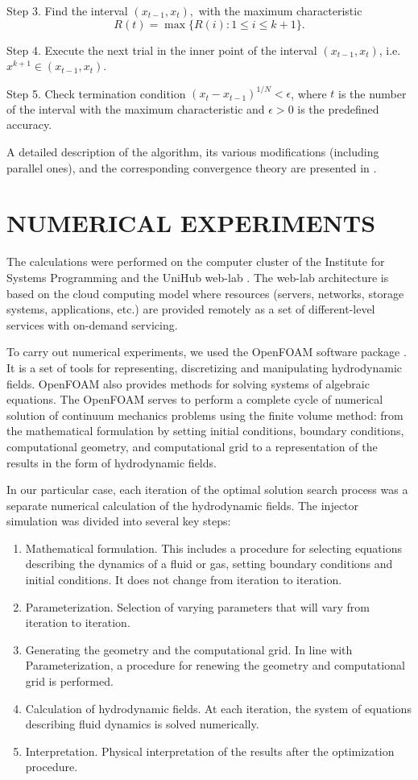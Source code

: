 \documentclass{aip-cp}
\begin{document}
Step 3. Find the interval $(x_{t-1},x_t),$ with the maximum characteristic 
\[
R(t)=\max\{R(i):1 \leq i \leq k+1\}.
\]

Step 4. Execute the next trial in the inner point of the interval  $(x_{t-1},x_t)$, i.e. $x^{k+1} \in (x_{t-1},x_t)$.

Step 5. Check termination condition  $\left(x_t-x_{t-1}\right)^{1/N}<\epsilon$, where $t$   is the number of the interval with the maximum characteristic and $\epsilon>0$ is the predefined accuracy.

A detailed description of the algorithm, its various modifications (including parallel ones), and the corresponding convergence  theory are presented in \cite{Strongin2000,Barkalov2010,Strongin2020}.
	

\section{NUMERICAL EXPERIMENTS}

The calculations were performed on the computer cluster of the Institute for Systems Programming and the UniHub web-lab \cite{UniHub}. The web-lab architecture is based on the cloud computing model where resources (servers, networks, storage systems, applications, etc.) are provided remotely as a set of different-level services with on-demand servicing.

To carry out numerical experiments, we used the OpenFOAM software package \cite{OpenFOAM}. It is a set of tools for representing, discretizing and manipulating hydrodynamic fields. OpenFOAM also provides methods for solving systems of algebraic equations. The OpenFOAM serves to perform a complete cycle of numerical solution of continuum mechanics problems using the finite volume method: from the mathematical formulation by setting initial conditions, boundary conditions, computational geometry, and computational grid to a representation of the results in the form of hydrodynamic fields.

In our particular case, each iteration of the optimal solution search process was a separate numerical calculation of the hydrodynamic fields. The injector simulation was divided into several key steps:
\begin{enumerate}
\item Mathematical formulation. This includes a procedure for selecting equations describing the dynamics of a fluid or gas, setting boundary conditions and initial conditions. It does not change from iteration to iteration.
\item Parameterization. Selection of varying parameters that will vary from iteration to iteration.
\item Generating the geometry and the computational grid. In line with Parameterization, a procedure for renewing the geometry and computational grid is performed.
\item Calculation of hydrodynamic fields. At each iteration, the system of equations describing fluid dynamics is solved numerically.
\item Interpretation. Physical interpretation of the results after the optimization procedure.
\end{enumerate}
\end{document}
